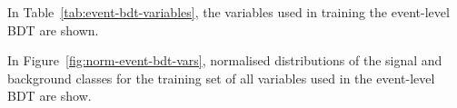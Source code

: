 In Table~\ref{tab:event-bdt-variables}, the variables used in training the event-level BDT are shown.
\begin{table}[htbp!]

\caption{A list of the observables used in the event-level BDT, ordered by importance (descending, top to bottom) is shown.}
	\label{tab:event-bdt-variables}
\end{table}

In Figure~\ref{fig:norm-event-bdt-vars}, normalised distributions of the signal and background classes for the training set of all variables used in the event-level BDT are show.


